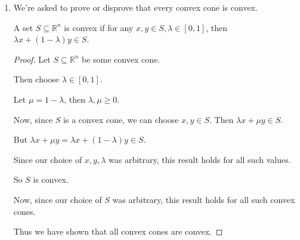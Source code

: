 \documentclass[12pt,letterpaper]{article}
\begin{document}
\begin{enumerate}
\begin{enumerate}
          We can represent a convex polyhedron as $\{x \in \mathbb{R}^n | Ax = b\}$,
          where $A \in \mathbb{R}^{m \times n}, b \in \mathbb{R}^m$.

          \begin{proof}
            Let $C = \{x \in \mathbb{R}^n | Ax = b\}$,
            where $A \in \mathbb{R}^{m \times n}, b \in \mathbb{R}^m$, be a convex polyhedron.

            Then choose some arbitrary $x, y \in C$ and $\lambda, \mu > 0 \in \mathbb{R}$.

            Now $A \left(\lambda x + \mu y\right) = A \lambda x + A \mu y = \lambda A x + \mu A y = \lambda b + \mu b = \left(\lambda + \mu \right) b > b$.

            So $\lambda x + \mu y \notin C$.

            Since we chose arbitrary $x, y, \lambda, \mu$, and $\lambda x + \mu y \notin C$,
            $C$ is not a convex cone.

            Then there is at least one convex polyhedron that is not a convex cone.

            Thus, we have disproved that every convex polyhedron is a convex cone.
          \end{proof}
        \item
          We're asked to prove or disprove that every convex cone is convex.

          A set $S \subseteq \mathbb{R}^n$ is convex
          if for any $x, y \in S, \lambda \in \left[0, 1\right]$,
          then $\lambda x + \left(1 - \lambda\right) y \in S$.

          \begin{proof}
            Let $S \subseteq \mathbb{R}^n$ be some convex cone.

            Then choose $\lambda \in \left[0, 1\right]$.

            Let $\mu = 1 - \lambda$, then $\lambda, \mu \geq 0$.

            Now, since $S$ is a convex cone, we can choose $x, y \in S$.
            Then $\lambda x + \mu y \in S$.

            But $\lambda x + \mu y = \lambda x + \left(1 - \lambda\right) y \in S$.

            Since our choice of $x, y, \lambda$ was arbitrary,
            this result holds for all such values.

            So $S$ is convex.

            Now, since our choice of $S$ was arbitrary,
            this result holds for all such convex cones.

            Thus we have shown that all convex cones are convex.
          \end{proof}
      \end{enumerate}
  \end{enumerate}
\end{document}
